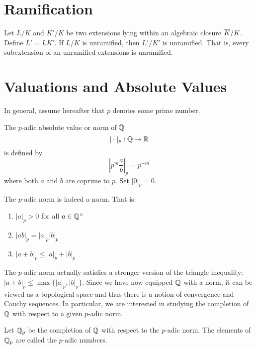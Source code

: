 \section{Ramification}

\begin{theorem}
    Let $L/K$ and $K'/K$ be two extensions lying within an algebraic closure $\overline{K}/K$. Define $L' = LK'$. If $L/K$ is unramified, then $L'/K'$ is unramified. That is, every subextension of an unramified extensions is unramified.
\end{theorem}
\section{Valuations and Absolute Values}

In general, assume hereafter that $p$ denotes some prime number.

\begin{definition}
    The $p$-adic absolute value or norm of $\mathbb{Q}$
        \[|\cdot |_p: \mathbb{Q} \to \mathbb{R}\]
    is defined by
        \[\left| p^m \frac{a}{b}\right|_{p} = p^{-m}\]
    where both $a$ and $b$ are coprime to $p$. Set $|0|_p = 0$.
\end{definition}

\begin{proposition}
    The $p$-adic norm is indeed a norm. That is:

    \begin{enumerate}
        \item $|a|_p > 0$ for all $a \in \mathbb{Q}^\times$
        \item $|ab|_p = |a|_p|b|_p$
        \item $|a + b|_p \leq |a|_p + |b|_p$
    \end{enumerate}
\end{proposition}

The $p$-adic norm actually satisfies a stronger version of the triangle inequality:
$|a + b|_p \leq \max\{ |a|_p ,|b|_p\}$. Since we have now equipped $\mathbb{Q}$ with a norm, it can be viewed as a topological space and thus there is a notion of convergence and Cauchy sequences. In particular, we are interested in studying the completion of $\mathbb{Q}$ with respect to a given $p$-adic norm.

\begin{definition}
    Let $\mathbb{Q}_p$ be the completion of $\mathbb{Q}$ with respect to the $p$-adic norm. The elements of $\mathbb{Q}_p$ are called the $p$-adic numbers.
\end{definition}

